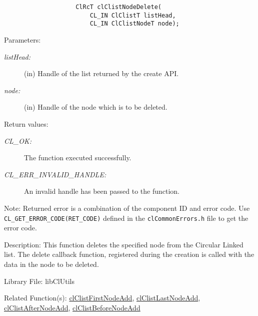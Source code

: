\begin{flushleft}
\begin{Desc}
\footnotesize\begin{verbatim}              
                   	ClRcT clClistNodeDelete(
                   		CL_IN ClClistT listHead,
                   		CL_IN ClClistNodeT node);
\end{verbatim}
\normalsize
\end{Desc}
\begin{Desc}
\item[Parameters:]
\begin{description}
\item[{\em list\-Head:}](in) Handle of the list returned by the create API. \item[{\em node:}](in) Handle of the node which is to be deleted.\end{description}
\end{Desc}
\begin{Desc}
\item[Return values:]
\begin{description}
\item[{\em CL\_\-OK:}]The function executed successfully. \item[{\em CL\_\-ERR\_\-INVALID\_\-HANDLE:}]An invalid handle has been passed to the function.
\end{description}
\end{Desc}
\begin{Desc}
\item[Note:]Returned error is a combination of the component ID and error code. Use {\tt{CL\_\-GET\_\-ERROR\_\-CODE(RET\_\-CODE)}} defined in
the {\tt{clCommonErrors.h}} file to get the error code.\end{Desc}
\begin{Desc}
\item[Description:]This function deletes the specified node from the Circular Linked list. The delete callback function, registered during the creation is
called with the data in the node to be deleted.\end{Desc}
\begin{Desc}
\item[Library File:]lib\-Cl\-Utils\end{Desc}
\begin{Desc}
\item[Related Function(s):]\hyperlink{pagecl102}{cl\-Clist\-First\-Node\-Add}, \hyperlink{pagecl103}{cl\-Clist\-Last\-Node\-Add},
\hyperlink{pagecl104}{cl\-Clist\-After\-Node\-Add}, \hyperlink{pagecl105}{cl\-Clist\-Before\-Node\-Add} \end{Desc}
\newpage



\end{flushleft}
